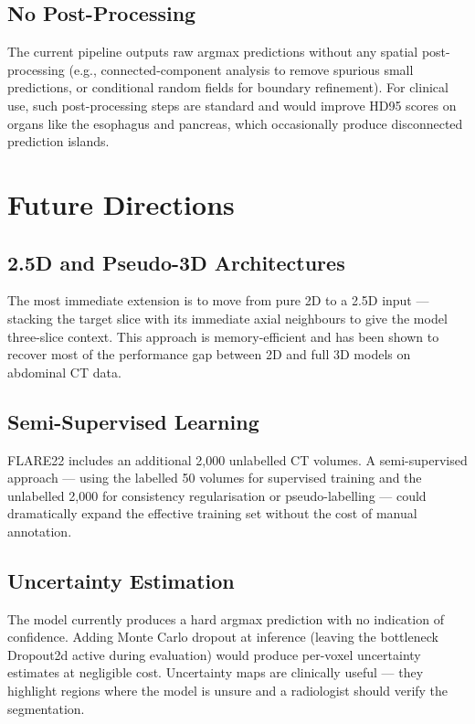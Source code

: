 \subsection{No Post-Processing}

The current pipeline outputs raw argmax predictions without any spatial post-processing (e.g.,
connected-component analysis to remove spurious small predictions, or conditional random fields
for boundary refinement). For clinical use, such post-processing steps are standard and would
improve HD95 scores on organs like the esophagus and pancreas, which occasionally produce
disconnected prediction islands.

\section{Future Directions}

\subsection{2.5D and Pseudo-3D Architectures}

The most immediate extension is to move from pure 2D to a 2.5D input --- stacking the target
slice with its immediate axial neighbours to give the model three-slice context. This approach
is memory-efficient and has been shown to recover most of the performance gap between 2D and
full 3D models on abdominal CT data.

\subsection{Semi-Supervised Learning}

FLARE22 includes an additional 2{,}000 unlabelled CT volumes. A semi-supervised approach ---
using the labelled 50 volumes for supervised training and the unlabelled 2{,}000 for consistency
regularisation or pseudo-labelling --- could dramatically expand the effective training set
without the cost of manual annotation.

\subsection{Uncertainty Estimation}

The model currently produces a hard argmax prediction with no indication of confidence. Adding
Monte Carlo dropout at inference (leaving the bottleneck Dropout2d active during evaluation)
would produce per-voxel uncertainty estimates at negligible cost. Uncertainty maps are
clinically useful --- they highlight regions where the model is unsure and a radiologist should
verify the segmentation.

